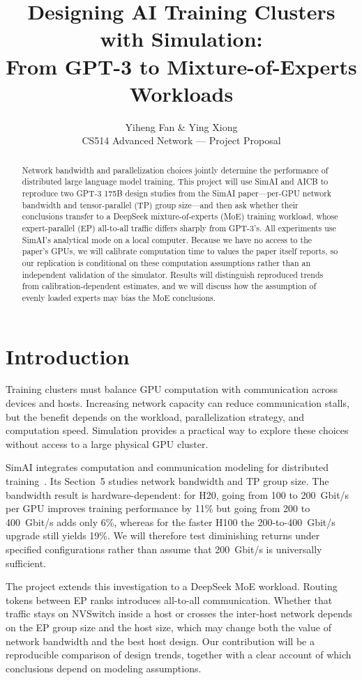 \documentclass[letterpaper,twocolumn,10pt]{article}
\title{Designing AI Training Clusters with Simulation:\\From GPT-3 to Mixture-of-Experts Workloads}
\author{Yiheng Fan \& Ying Xiong \\ CS514 Advanced Network --- Project Proposal}
\date{}
\begin{document}
\pagestyle{plain}
\maketitle
\begin{abstract}
Network bandwidth and parallelization choices jointly determine the performance of distributed large language model training. This project will use SimAI and AICB to reproduce two GPT-3 175B design studies from the SimAI paper---per-GPU network bandwidth and tensor-parallel (TP) group size---and then ask whether their conclusions transfer to a DeepSeek mixture-of-experts (MoE) training workload, whose expert-parallel (EP) all-to-all traffic differs sharply from GPT-3's. All experiments use SimAI's analytical mode on a local computer. Because we have no access to the paper's GPUs, we will calibrate computation time to values the paper itself reports, so our replication is conditional on these computation assumptions rather than an independent validation of the simulator. Results will distinguish reproduced trends from calibration-dependent estimates, and we will discuss how the assumption of evenly loaded experts may bias the MoE conclusions.
\end{abstract}

\section{Introduction}
Training clusters must balance GPU computation with communication across devices and hosts. Increasing network capacity can reduce communication stalls, but the benefit depends on the workload, parallelization strategy, and computation speed. Simulation provides a practical way to explore these choices without access to a large physical GPU cluster.

SimAI integrates computation and communication modeling for distributed training~\cite{simai}. Its Section~5 studies network bandwidth and TP group size. The bandwidth result is hardware-dependent: for H20, going from 100 to 200~Gbit/s per GPU improves training performance by 11\% but going from 200 to 400~Gbit/s adds only 6\%, whereas for the faster H100 the 200-to-400~Gbit/s upgrade still yields 19\%. We will therefore test diminishing returns under specified configurations rather than assume that 200~Gbit/s is universally sufficient.

The project extends this investigation to a DeepSeek MoE workload. Routing tokens between EP ranks introduces all-to-all communication. Whether that traffic stays on NVSwitch inside a host or crosses the inter-host network depends on the EP group size and the host size, which may change both the value of network bandwidth and the best host design. Our contribution will be a reproducible comparison of design trends, together with a clear account of which conclusions depend on modeling assumptions.
\end{document}
